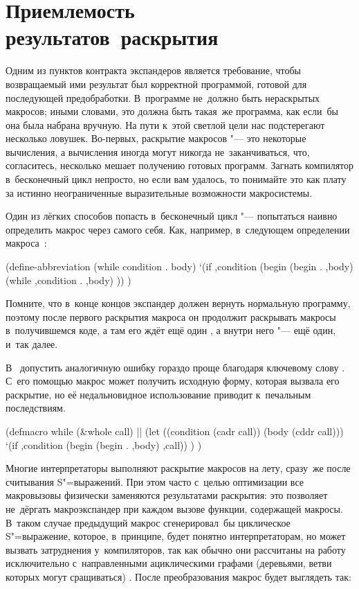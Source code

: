 \section{Приемлемость результатов~раскрытия}\label{macros/sect:accept}

Одним из пунктов контракта экспандеров является требование, чтобы возвращаемый
ими результат был корректной программой, готовой для последующей предобработки.
В~программе не~должно быть нераскрытых макросов; иными словами, это должна быть
такая~же программа, как если~бы она была набрана вручную. На пути к~этой светлой
цели нас подстерегают несколько ловушек. Во-первых, раскрытие макросов "--- это
некоторые вычисления, а вычисления иногда могут никогда не~заканчиваться, что,
согласитесь, несколько мешает получению готовых программ. Загнать компилятор
в~бесконечный цикл непросто, но если вам удалось, то понимайте это как плату
за истинно неограниченные выразительные возможности макросистемы.

Один из лёгких способов попасть в~бесконечный цикл "--- попытаться наивно
определить макрос через самого себя. Как, например, в~следующем определении
макроса~:

\begin{code:lisp}
(define-abbreviation (while condition . body)
  `(if ,condition (begin (begin . ,body)
                         (while ,condition . ,body) )) )
\end{code:lisp}

Помните, что в~конце концов экспандер должен вернуть нормальную программу,
поэтому после первого раскрытия макроса  он продолжит раскрывать
макросы в~получившемся коде, а там его ждёт ещё один , а внутри него
"--- ещё один, и~так далее.

В~{\CommonLisp} допустить аналогичную ошибку гораздо проще благодаря ключевому
слову . С~его помощью макрос может получить исходную форму, которая
вызвала его раскрытие, но её недальновидное использование приводит к~печальным
последствиям.

\begin{code:lisp}
(defmacro while (&whole call)    |\dialect{\CommonLisp}|
  (let ((condition (cadr call))
        (body      (cddr call)))
    `(if ,condition (begin (begin . ,body) ,call)) ) )
\end{code:lisp}

Многие интерпретаторы выполняют раскрытие макросов на лету, сразу~же после
считывания S"=выражений. При этом часто с~целью оптимизации все макровызовы
физически заменяются результатами раскрытия: это позволяет не~дёргать
макроэкспандер при каждом вызове функции, содержащей макросы. В~таком случае
предыдущий макрос  сгенерировал~бы циклическое S"=выражение, которое,
в~принципе, будет понятно интерпретаторам, но может вызвать затруднения
у~компиляторов, так как обычно они рассчитаны на работу исключительно
с~направленными ациклическими графами (деревьями, ветви которых могут
сращиваться) \cite{que92a}. После преобразования макрос  будет
выглядеть так:

